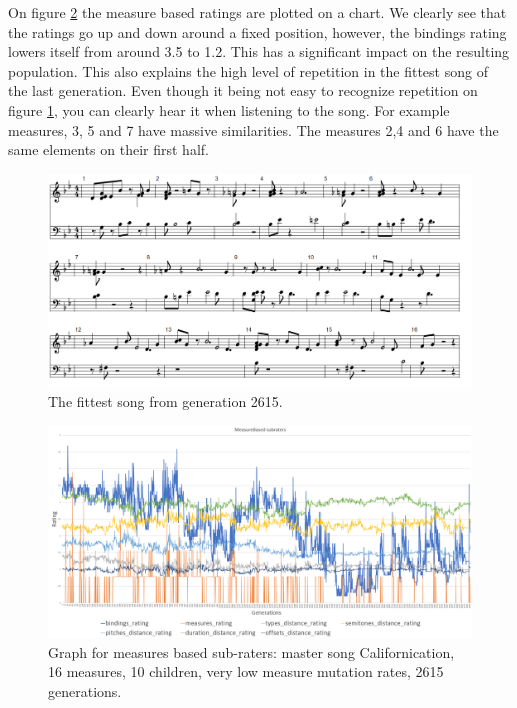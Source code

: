 \documentclass[a4paper]{article}
\begin{document}
On figure \ref{fig:rhcp_3_m} the measure based ratings are plotted on a chart. We clearly see that the ratings go up and down around a fixed position, however, the bindings rating lowers itself from around 3.5 to 1.2. This has a significant impact on the resulting population. This also explains the high level of repetition in the fittest song of the last generation. Even though it being not easy to recognize repetition on figure \ref{fig:rhcp_3_song}, you can clearly hear it when listening to the song. For example measures, 3, 5 and 7 have massive similarities. The measures 2,4 and 6 have the same elements on their first half.

\begin{figure}[H]
	\advance\leftskip-1.5cm
	\includegraphics[width=1.2\textwidth]{Fotos/results/rhcp/song3.png}
	\caption{The fittest song from generation 2615.}
	\label{fig:rhcp_3_song}
\end{figure}

\begin{figure}
	\advance\leftskip-1.5cm
	\includegraphics[width=1.2\textwidth]{Fotos/results/rhcp/measures_rating_3.png}
	\caption{Graph for measures based sub-raters: master song Californication, 16 measures, 10 children, very low measure mutation rates, 2615 generations.}
	\label{fig:rhcp_3_m}
\end{figure}
\end{document}
